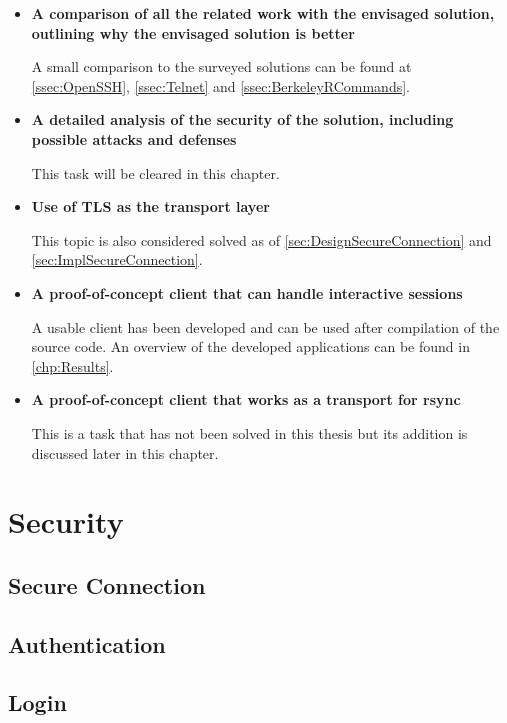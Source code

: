 \documentclass[10pt,a4paper,titlepage,twoside,english,final]{zhawreprt}
\begin{document}
\begin{itemize}
\item \textbf{A comparison of all the related work with the envisaged solution, outlining why the envisaged solution is better}

A small comparison to the surveyed solutions can be found at \ref{ssec:OpenSSH}, \ref{ssec:Telnet} and \ref{ssec:BerkeleyRCommands}.

\item \textbf{A detailed analysis of the security of the solution, including
possible attacks and defenses}

This task will be cleared in this chapter.

\item \textbf{Use of TLS as the transport layer}

This topic is also considered solved as of \ref{sec:DesignSecureConnection} and \ref{sec:ImplSecureConnection}.

\item \textbf{A proof-of-concept client that can handle interactive sessions}

A usable client has been developed and can be used after compilation of the source code.
An overview of the developed applications can be found in \ref{chp:Results}.

\item \textbf{A proof-of-concept client that works as a transport for rsync}

This is a task that has not been solved in this thesis but its addition is discussed later in this chapter.
\end{itemize}

\section{Security}\label{sec:Security}
\subsection{Secure Connection}\label{sec:SecSecureConnection}
\subsection{Authentication}\label{sec:SecAuthentication}
\subsection{Login}\label{sec:SecLogin}
\end{document}

